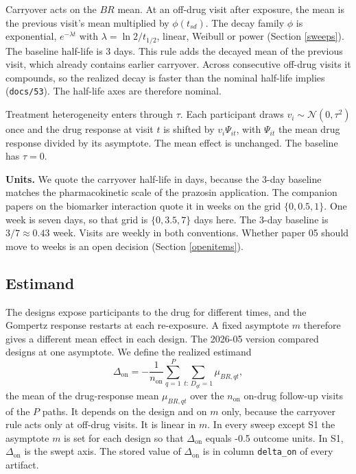 \documentclass[
  11pt,
]{article}
\begin{document}
Carryover acts on the \(BR\) mean. At an off-drug visit after exposure, the mean is the previous visit's mean multiplied by \(\phi(t_{sd})\). The decay family \(\phi\) is exponential, \(e^{-\lambda t}\) with \(\lambda = \ln 2 / t_{1/2}\), linear, Weibull or power (Section \ref{sweeps}). The baseline half-life is 3 days. This rule adds the decayed mean of the previous visit, which already contains earlier carryover. Across consecutive off-drug visits it compounds, so the realized decay is faster than the nominal half-life implies (\texttt{docs/53}). The half-life axes are therefore nominal.

Treatment heterogeneity enters through \(\tau\). Each participant draws \(v_i \sim \mathcal N(0, \tau^2)\) once and the drug response at visit \(t\) is shifted by \(v_i \Psi_{it}\), with \(\Psi_{it}\) the mean drug response divided by its asymptote. The mean effect is unchanged. The baseline has \(\tau = 0\).

\textbf{Units.} We quote the carryover half-life in days, because the 3-day baseline matches the pharmacokinetic scale of the prazosin application. The companion papers on the biomarker interaction quote it in weeks on the grid \(\{0, 0.5, 1\}\). One week is seven days, so that grid is \(\{0, 3.5, 7\}\) days here. The 3-day baseline is \(3/7 \approx 0.43\) week. Visits are weekly in both conventions. Whether paper 05 should move to weeks is an open decision (Section \ref{openitems}).

\subsection{Estimand}\label{estimand}

The designs expose participants to the drug for different times, and the Gompertz response restarts at each re-exposure. A fixed asymptote \(m\) therefore gives a different mean effect in each design. The 2026-05 version compared designs at one asymptote. We define the realized estimand
\[\Delta_{\mathrm{on}} = -\frac{1}{n_{\mathrm{on}}}\sum_{q=1}^{P}\sum_{t:\,D_{qt}=1}\mu_{BR,qt},\]
the mean of the drug-response mean \(\mu_{BR,qt}\) over the \(n_{\mathrm{on}}\) on-drug follow-up visits of the \(P\) paths. It depends on the design and on \(m\) only, because the carryover rule acts only at off-drug visits. It is linear in \(m\). In every sweep except S1 the asymptote \(m\) is set for each design so that \(\Delta_{\mathrm{on}}\) equals -0.5 outcome units. In S1, \(\Delta_{\mathrm{on}}\) is the swept axis. The stored value of \(\Delta_{\mathrm{on}}\) is in column \texttt{delta\_on} of every artifact.
\end{document}
